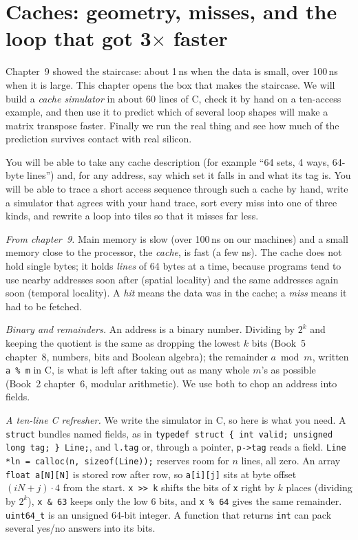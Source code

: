 \chapter{Caches: geometry, misses, and the loop that got 3$\times$ faster}
\label{ch:systems10}

Chapter~9 showed the staircase: about 1\,ns when the data is small,
over 100\,ns when it is large. This chapter opens the box that makes
the staircase. We will build a \emph{cache simulator} in about 60 lines
of C, check it by hand on a ten-access example, and then use it to
predict which of several loop shapes will make a matrix transpose
faster. Finally we run the real thing and see how much of the
prediction survives contact with real silicon.

\begin{rulebox}
You will be able to take any cache description (for example ``64 sets,
4 ways, 64-byte lines'') and, for any address, say which set it falls
in and what its tag is. You will be able to trace a short access
sequence through such a cache by hand, write a simulator that agrees
with your hand trace, sort every miss into one of three kinds, and
rewrite a loop into tiles so that it misses far less.
\end{rulebox}

\begin{rulebox}
\emph{From chapter~9.} Main memory is slow (over 100\,ns on our
machines) and a small memory close to the processor, the
\emph{cache}, is fast (a few ns). The cache does not hold single
bytes; it holds \emph{lines} of 64 bytes at a time, because programs
tend to use nearby addresses soon after (spatial locality) and the same
addresses again soon (temporal locality). A \emph{hit} means the data
was in the cache; a \emph{miss} means it had to be fetched.

\emph{Binary and remainders.} An address is a binary number. Dividing
by \(2^k\) and keeping the quotient is the same as dropping the lowest
\(k\) bits (Book~5 chapter~8, numbers, bits and Boolean algebra); the
remainder \(a \bmod m\), written \texttt{a \% m} in C, is what is
left after taking out as many whole \(m\)'s as possible (Book~2
chapter~6, modular arithmetic). We use both to chop an address into
fields.

\emph{A ten-line C refresher.} We write the simulator in C, so here is
what you need. A \texttt{struct} bundles named fields, as in
\texttt{typedef struct \{ int valid; unsigned long tag; \} Line;}, and
\texttt{l.tag} or, through a pointer, \texttt{p->tag} reads a field.
\texttt{Line *ln = calloc(n, sizeof(Line));} reserves room for \(n\)
lines, all zero. An array \texttt{float a[N][N]} is stored row after
row, so \texttt{a[i][j]} sits at byte offset \((iN+j)\cdot 4\) from
the start. \texttt{x >> k} shifts the bits of \texttt{x} right by
\(k\) places (dividing by \(2^k\)), \texttt{x \& 63} keeps only the
low 6 bits, and \texttt{x \% 64} gives the same remainder.
\texttt{uint64\_t} is an unsigned 64-bit integer. A function that
returns \texttt{int} can pack several yes/no answers into its bits.
\end{rulebox}

